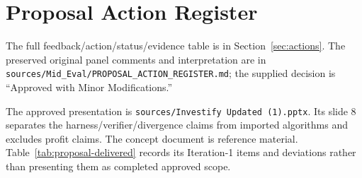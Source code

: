 \chapter{Proposal Action Register}
The full feedback/action/status/evidence table is in Section~\ref{sec:actions}. The preserved original panel comments and interpretation are in \nolinkurl{sources/Mid_Eval/PROPOSAL_ACTION_REGISTER.md}; the supplied decision is ``Approved with Minor Modifications.''

The approved presentation is \nolinkurl{sources/Investify Updated (1).pptx}. Its slide 8 separates the harness/verifier/divergence claims from imported algorithms and excludes profit claims. The concept document is reference material. Table~\ref{tab:proposal-delivered} records its Iteration-1 items and deviations rather than presenting them as completed approved scope.
